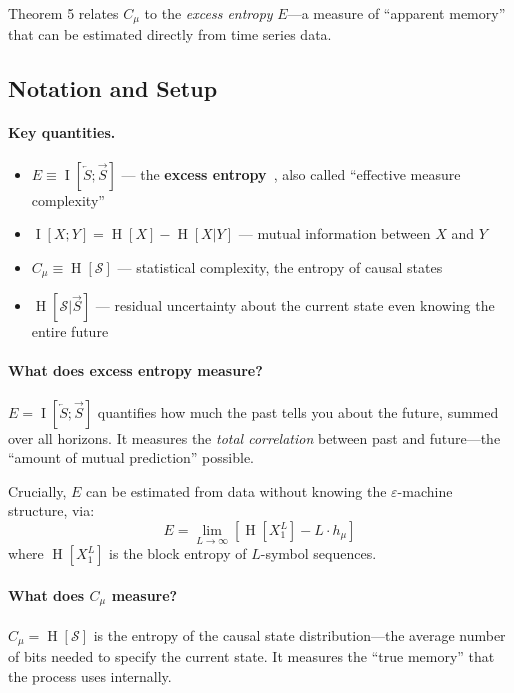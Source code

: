 \documentclass[11pt,a4paper]{article}
\theoremstyle{definition}
\theoremstyle{plain}
\newcommand{\eps}{\varepsilon}
\newcommand{\Cmu}{C_\mu}
\newcommand{\hmu}{h_\mu}
\newcommand{\calS}{\mathcal{S}}
\newcommand{\Past}{\overleftarrow{S}}
\newcommand{\Future}{\overrightarrow{S}}
\DeclareMathOperator{\Ent}{H}
\DeclareMathOperator{\MI}{I}
\begin{document}
Theorem 5 relates $\Cmu$ to the \emph{excess entropy} $E$---a measure of ``apparent memory'' that can be estimated directly from time series data.

\subsection{Notation and Setup}

\paragraph{Key quantities.}
\begin{itemize}[nosep]
    \item $E \equiv \MI[\Past; \Future]$ --- the \textbf{excess entropy}~\cite{grassberger1986toward}, also called ``effective measure complexity''
    \item $\MI[X; Y] = \Ent[X] - \Ent[X|Y]$ --- mutual information between $X$ and $Y$
    \item $\Cmu \equiv \Ent[\calS]$ --- statistical complexity, the entropy of causal states
    \item $\Ent[\calS | \Future]$ --- residual uncertainty about the current state even knowing the entire future
\end{itemize}

\paragraph{What does excess entropy measure?}
$E = \MI[\Past; \Future]$ quantifies how much the past tells you about the future, summed over all horizons. It measures the \emph{total correlation} between past and future---the ``amount of mutual prediction'' possible.

Crucially, $E$ can be estimated from data without knowing the $\eps$-machine structure, via:
\begin{equation}
    E = \lim_{L \to \infty} \left[ \Ent[X_1^L] - L \cdot \hmu \right]
\end{equation}
where $\Ent[X_1^L]$ is the block entropy of $L$-symbol sequences.

\paragraph{What does $\Cmu$ measure?}
$\Cmu = \Ent[\calS]$ is the entropy of the causal state distribution---the average number of bits needed to specify the current state. It measures the ``true memory'' that the process uses internally.
\end{document}
